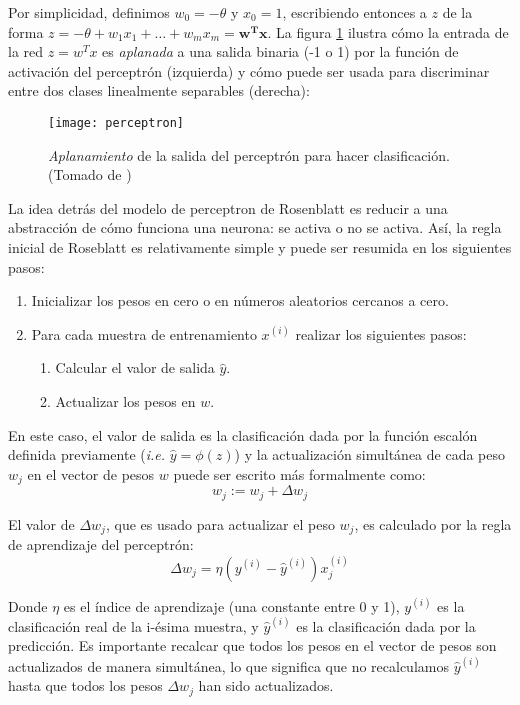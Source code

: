 Por simplicidad, definimos $w_0=-\theta$ y $x_0=1$, escribiendo
entonces a $z$ de la forma $z=-\theta + w_1x_1 + \dots + w_mx_m =
\mathbf{w^Tx}$.  La figura \ref{fig:binary} ilustra cómo la entrada de
la red $z=w^Tx$ es \textit{aplanada} a una salida binaria (-1 o 1) por
la función de activación del perceptrón (izquierda) y cómo puede ser
usada para discriminar entre dos clases linealmente separables
(derecha):
\begin{figure}[H]
  \texttt{[image: perceptron]} \centering
  \caption{\textit{Aplanamiento} de la salida del perceptrón para
    hacer clasificación.  (Tomado de \cite{python})}
  \label{fig:binary}
\end{figure}

La idea detrás del modelo de perceptron de Rosenblatt es reducir a una
abstracción de cómo funciona una neurona: se activa o no se
activa. Así, la regla inicial de Roseblatt es relativamente simple y
puede ser resumida en los siguientes pasos:
\begin{enumerate}
  \item Inicializar los pesos en cero o en números aleatorios cercanos
    a cero.
  \item Para cada muestra de entrenamiento $x^{(i)}$ realizar los
    siguientes pasos:
  \begin{enumerate}
    \item Calcular el valor de salida $\hat y$.
    \item Actualizar los pesos en $w$.
  \end{enumerate}
\end{enumerate}


En este caso, el valor de salida es la clasificación dada por la
función escalón definida previamente (\textit{i.e.} $\hat y
= \phi(z)$) y la actualización simultánea de cada peso $w_j$ en el
vector de pesos $w$ puede ser escrito más formalmente como:
\begin{equation}
  w_j := w_j + \Delta w_j
\end{equation}

El valor de $\Delta w_j$, que es usado para actualizar el peso $w_j$,
es calculado por la regla de aprendizaje del perceptrón:
\begin{equation}
  \Delta w_j = \eta (y^{(i)} - \hat y^{(i)})x^{(i)}_j
\end{equation}

Donde $\eta$ es el índice de aprendizaje (una constante entre 0 y 1),
$y^{(i)}$ es la clasificación real de la i-ésima muestra, y $\hat
y^{(i)}$ es la clasificación dada por la predicción. Es importante
recalcar que todos los pesos en el vector de pesos son actualizados de
manera simultánea, lo que significa que no recalculamos $\hat y^{(i)}$
hasta que todos los pesos $\Delta w_j$ han sido actualizados.

